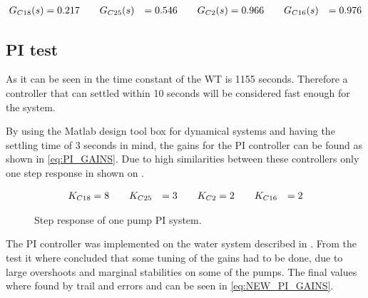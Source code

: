 \begin{equation}
\centering
	\begin{split}
	G_{C18}(s) &= 0.217 \hspace{20pt} G_{C25}(s) &= 0.546 \hspace{20pt} G_{C2}(s) &= 0.966 \hspace{20pt} G_{C16}(s) &= 0.976
	\end{split}
	\label{mod:lin_const_pump}
\end{equation}





\subsection*{PI test}

As it can be seen in  the time constant of the WT is 1155 seconds. Therefore a controller that can settled within 10 seconds will be considered fast enough for the system.

 
By using the Matlab design tool box for dynamical systems and having the settling time of 3 seconds in mind, the gains for the PI controller can be found as shown in \eqref{eq:PI_GAINS}. 
Due to high similarities between these controllers only one step response in shown on .

\begin{equation}
\centering
	\begin{split}
	K_{C18} &= 8 \hspace{20pt} K_{C25} &= 3 \hspace{20pt} K_{C2} &= 2 \hspace{20pt} K_{C16} &= 2
	\end{split}
	\label{eq:PI_GAINS}
\end{equation}

\begin{figure}[H]
\centering

\caption{Step response of one pump PI system.}
\label{fig:Tikz_PI_PUMP_GAIN}
\end{figure}



The PI controller was implemented on the water system described in . From the test it where concluded that some tuning of the gains had to be done, due to large overshoots and marginal stabilities on some of the pumps. The final values where found by trail and errors and can be seen in \eqref{eq:NEW_PI_GAINS}. 

